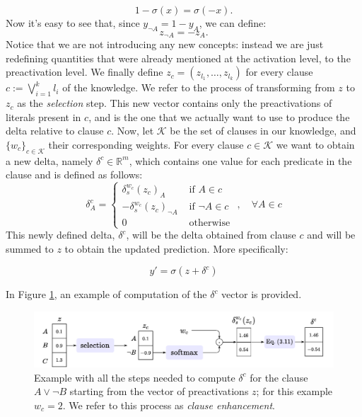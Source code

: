 \begin{equation*}
1 - \sigma(x) = \sigma(-x).
\end{equation*}
Now it's easy to see that, since $y_{\neg A} = 1 - y_A$, we can define:
\begin{equation*}
z_{\neg A} = -z_A.
\end{equation*}
Notice that we are not introducing any new concepts: instead we are just redefining quantities that were already mentioned at the activation level, to the preactivation level. %
We finally define $z_c = \left(z_{l_1}, \dots, z_{l_k}\right)$ for every clause $c := \bigvee_{i=1}^k l_i$ of the knowledge. We refer to the process of transforming from $z$ to $z_c$ as the \textit{selection} step. This new vector contains only the preactivations of literals present in $c$, and is the one that we actually want to use to produce the delta relative to clause $c$. Now, let $\mathcal{K}$ be the set of clauses in our knowledge, and $\{w_c\}_{c\in\mathcal{K}}$ their corresponding weights. For every clause $c\in \mathcal{K}$ we want to obtain a new delta, namely $\delta^c \in \mathbb{R}^m$, which contains one value for each predicate in the clause and is defined as follows:
\begin{equation}
\delta_{A}^{c}= \begin{cases}\delta_{s}^{w_{c}}\left(z_{c}\right)_{A} & \text { if } A \in c \\ -\delta_{s}^{w_{c}}\left(z_{c}\right)_{\neg A} & \text { if } \neg A \in c \\ 0 & \text { otherwise }\end{cases}, \quad \forall A \in c
\label{eq:delta_c}
\end{equation}
This newly defined delta, $\delta^c$, will be the delta obtained from clause $c$ and will be summed to $z$ to obtain the updated prediction. More specifically:

$$y' = \sigma(z + \delta^c)$$

In Figure \ref{fig:delta_single_clause}, an example of computation of the $\delta^ c$ vector is provided.

\begin{figure}[h!]
	\centering
	\includegraphics[width=\linewidth]{figures/delta_single_clause.pdf}
	\caption{Example with all the steps needed to compute $\delta^c$ for the clause $A \vee \neg B$ starting from the vector of preactivations $z$; for this example $w_c=2$. We refer to this process as \textit{clause enhancement}.}
	\label{fig:delta_single_clause}
\end{figure}


